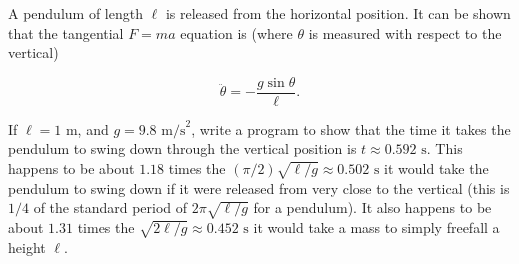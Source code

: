 A pendulum of length $\ell$ is released from the horizontal position. It can be shown that the tangential $F = ma$ equation is (where $\theta$ is measured with respect to the vertical)

\begin{equation} \ddot{\theta} = -\frac{g \sin \theta}{\ell}. \tag{1.20} \end{equation}

If $\ell = 1 \text{ m}$, and $g = 9.8 \text{ m/s}^2$, write a program to show that the time it takes the pendulum to swing down through the vertical position is $t \approx 0.592 \text{ s}$. This happens to be about $1.18$ times the $(\pi/2)\sqrt{\ell/g} \approx 0.502 \text{ s}$ it would take the pendulum to swing down if it were released from very close to the vertical (this is $1/4$ of the standard period of $2\pi\sqrt{\ell/g}$ for a pendulum). It also happens to be about $1.31$ times the $\sqrt{2\ell/g} \approx 0.452 \text{ s}$ it would take a mass to simply freefall a height $\ell$.